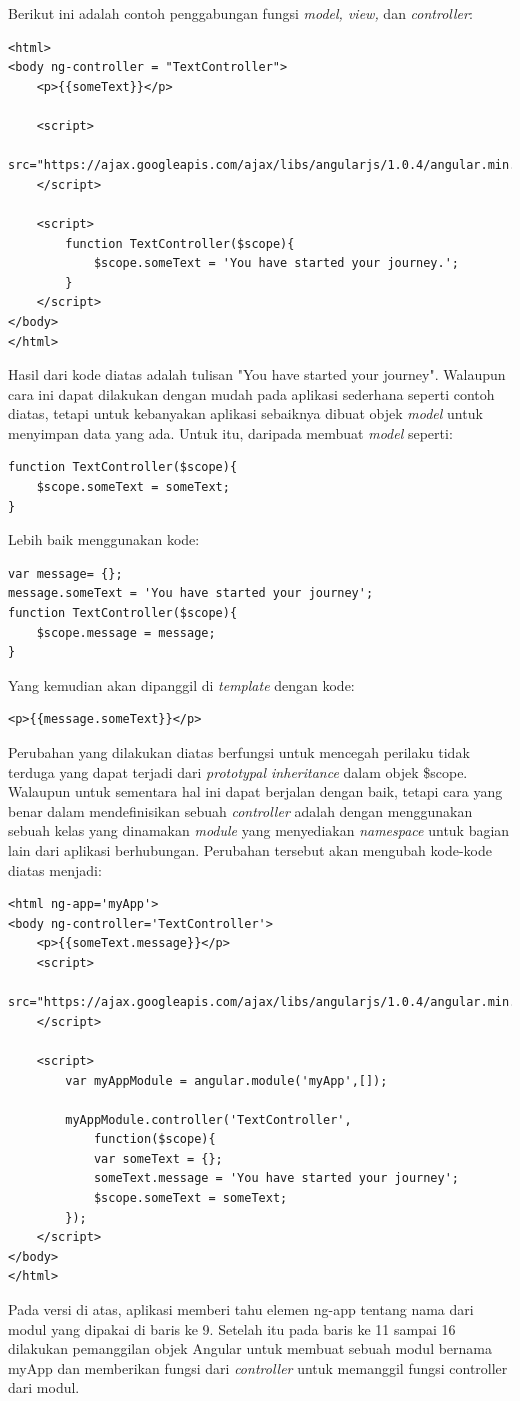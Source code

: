 	Berikut ini adalah contoh penggabungan fungsi \textit{model, view,} dan \textit{controller}:
\begin{lstlisting}
<html>
<body ng-controller = "TextController">
	<p>{{someText}}</p>
	
	<script>
		src="https://ajax.googleapis.com/ajax/libs/angularjs/1.0.4/angular.min.js">
	</script>
	
	<script>
		function TextController($scope){
			$scope.someText = 'You have started your journey.';
		}
	</script>
</body>
</html>
\end{lstlisting}
	
	Hasil dari kode diatas adalah tulisan "You have started your journey". Walaupun cara ini dapat dilakukan dengan mudah pada aplikasi sederhana seperti contoh diatas, tetapi untuk kebanyakan aplikasi sebaiknya dibuat objek \textit{model} untuk menyimpan data yang ada. Untuk itu, daripada membuat \textit{model} seperti:
	
\begin{lstlisting}
function TextController($scope){
	$scope.someText = someText;
}
\end{lstlisting}
	
	Lebih baik menggunakan kode:
\begin{lstlisting}
var message= {};
message.someText = 'You have started your journey';
function TextController($scope){
	$scope.message = message;
}
\end{lstlisting}
	Yang kemudian akan dipanggil di \textit{template} dengan kode:
\begin{lstlisting}
<p>{{message.someText}}</p>
\end{lstlisting}
	Perubahan yang dilakukan diatas berfungsi untuk mencegah perilaku tidak terduga yang dapat terjadi dari \textit{prototypal inheritance} dalam objek \$scope. Walaupun untuk sementara hal ini dapat berjalan dengan baik, tetapi cara yang benar dalam mendefinisikan sebuah \textit{controller} adalah dengan menggunakan sebuah kelas yang dinamakan \textit{module} yang menyediakan \textit{namespace} untuk bagian lain dari aplikasi berhubungan. Perubahan tersebut akan mengubah kode-kode diatas menjadi:
	\begin{lstlisting}
<html ng-app='myApp'>
<body ng-controller='TextController'>
	<p>{{someText.message}}</p>
	<script>
		src="https://ajax.googleapis.com/ajax/libs/angularjs/1.0.4/angular.min.js">
	</script>
	
	<script>
		var myAppModule = angular.module('myApp',[]);
		
		myAppModule.controller('TextController',
			function($scope){
			var someText = {};
			someText.message = 'You have started your journey';
			$scope.someText = someText;
		});
	</script>
</body>
</html>
	\end{lstlisting}
	Pada versi di atas, aplikasi memberi tahu elemen ng-app tentang nama dari modul yang dipakai di baris ke 9. Setelah itu pada baris ke 11 sampai 16 dilakukan pemanggilan objek Angular untuk membuat sebuah modul bernama myApp dan memberikan fungsi dari \textit{controller} untuk memanggil fungsi controller dari modul.
	
